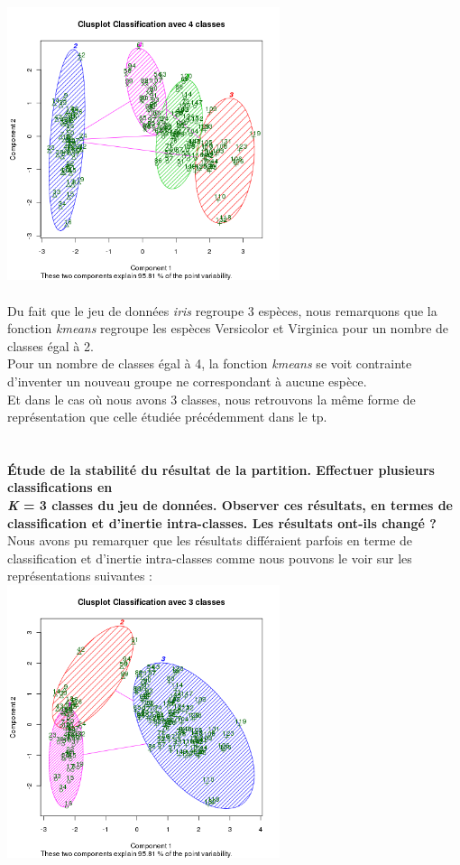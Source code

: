 \documentclass[a4paper, 10pt]{article}
\begin{document}
\includegraphics[height = 8cm, width = 8cm]{plots/clusplot_kmeans_3.png}\\ \\
Du fait que le jeu de donn\'ees \textit{iris} regroupe 3 esp\`eces, nous remarquons que la fonction \textit{kmeans} regroupe les esp\`eces Versicolor et Virginica
pour un nombre de classes \'egal \`a 2.\\
Pour un nombre de classes \'egal \`a 4, la fonction \textit{kmeans} se voit contrainte d'inventer un nouveau groupe ne correspondant \`a aucune esp\`ece.\\
Et dans le cas o\`u nous avons 3 classes, nous retrouvons la m\^eme forme de repr\'esentation que
celle \'etudi\'ee pr\'ec\'edemment dans le tp.\\ \\ \\
\textbf{\'Etude de la stabilit\'e du r\'esultat de la partition.
Effectuer plusieurs classifications en\\\textit{K} = 3 classes du jeu de donn\'ees.
Observer ces r\'esultats, en termes de classification et d'inertie intra-classes. Les r\'esultats ont-ils chang\'e ? }\\
Nous avons pu remarquer que les r\'esultats diff\'eraient parfois en terme de classification et d'inertie intra-classes comme nous pouvons le voir
sur les repr\'esentations suivantes :\\
\includegraphics[height = 8cm, width = 8cm]{plots/clusplot_kmeans_2.png}
\end{document}
